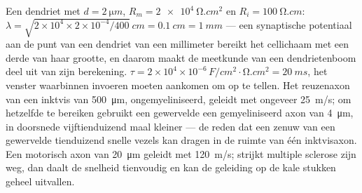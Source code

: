 \begin{example}\label{ex:b3:nervous-systems:numbers}
Een dendriet met $d = \qty{2}{\micro m}$, $R_{m} = \qty{2e4}{\ohm.cm^2}$
en $R_{i} = \qty{100}{\ohm.cm}$: $\lambda = \sqrt{2\times 10^{4}\times
2\times 10^{-4}/400}\ \unit{cm} = \qty{0.1}{cm} = \qty{1}{mm}$ --- een
synaptische potentiaal aan de punt van een dendriet van een millimeter
bereikt het cellichaam met een derde van haar grootte, en daarom maakt
de meetkunde van een dendrietenboom deel uit van zijn berekening.
$\tau = 2\times 10^{4}\times
10^{-6}\,\unit{F/cm^2}\cdot\unit{\ohm.cm^2} = \qty{20}{ms}$, het venster
waarbinnen invoeren moeten aankomen om op te tellen. Het reuzenaxon van
een inktvis van \qty{500}{\micro m}, ongemyeliniseerd, geleidt met
ongeveer \qty{25}{m/s}; om hetzelfde te bereiken gebruikt een gewervelde
een gemyeliniseerd axon van \qty{4}{\micro m}, in doorsnede
vijftienduizend maal kleiner --- de reden dat een zenuw van een
gewervelde tienduizend snelle vezels kan dragen in de ruimte van één
inktvisaxon. Een motorisch axon van \qty{20}{\micro m} geleidt met
\qty{120}{m/s}; strijkt multiple sclerose zijn  weg, dan daalt de
snelheid tienvoudig en kan de geleiding op de kale stukken geheel
uitvallen.
\end{example}

